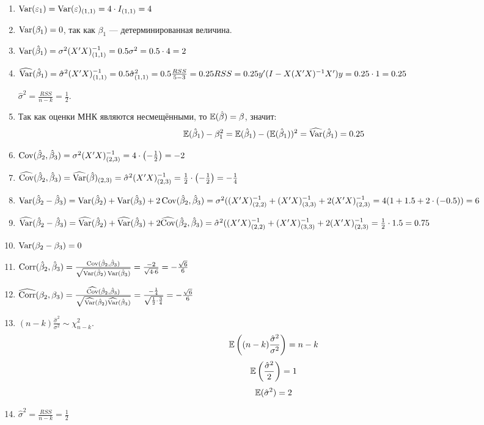 \begin{problem}
\begin{sol}
\begin{enumerate}
\item $\operatorname{Var}(\varepsilon_1)=\operatorname{Var}(\varepsilon)_{(1,1)}=4\cdot I_{(1,1)}=4$
\item $\operatorname{Var}(\beta_1)=0$, так как $\beta_1$ — детерминированная величина.
\item $\operatorname{Var}(\hat{\beta}_1)=\sigma^2(X'X)^{-1}_{(1,1)}=0.5\sigma^2=0.5\cdot 4=2$
\item $\widehat{\operatorname{Var}}(\hat{\beta}_1)=\hat\sigma^2(X'X)^{-1}_{(1,1)}=0.5\hat\sigma^2_{(1,1)}=0.5\frac{RSS}{5-3}=0.25RSS=0.25y'(I-X(X'X)^{-1}X')y=0.25\cdot 1=0.25$

$\hat\sigma^2=\frac{RSS}{n-k}=\frac12$.

\item Так как оценки МНК являются несмещёнными, то $\mathbb{E}(\hat{\beta})=\beta$, значит:
\[
\mathbb{E}(\hat{\beta}_1)-\beta_1^2=\mathbb{E}(\hat{\beta}_1)-(\mathbb{E}(\hat{\beta}_1))^2=\widehat{\operatorname{Var}}(\hat{\beta}_1)=0.25
\]

\item $\operatorname{Cov}(\hat{\beta}_2,\hat{\beta}_3)=\sigma^2(X'X)^{-1}_{(2,3)}=4\cdot\left(-\frac12\right)=-2$
\item $\widehat{\operatorname{Cov}}(\hat{\beta}_2,\hat{\beta}_3)=\widehat{\operatorname{Var}}(\hat\beta)_{(2,3)}=\hat\sigma^2(X'X)^{-1}_{(2,3)}=\frac{1}{2}\cdot\left(-\frac12\right)=-\frac14$

\item $\operatorname{Var}(\hat{\beta}_2-\hat{\beta}_3)=\operatorname{Var}(\hat{\beta}_2)+\operatorname{Var}(\hat{\beta}_3)+2\operatorname{Cov}(\hat{\beta}_2,\hat{\beta}_3)=\sigma^2((X'X)^{-1}_{(2,2)}+(X'X)^{-1}_{(3,3)}+2(X'X)^{-1}_{(2,3)}=4(1+1.5+2\cdot(-0.5))=6$

\item $\widehat{\operatorname{Var}}(\hat{\beta}_2-\hat{\beta}_3)=\widehat{\operatorname{Var}}(\hat{\beta}_2)+\widehat{\operatorname{Var}}(\hat{\beta}_3)+2\widehat{\operatorname{Cov}}(\hat{\beta}_2,\hat{\beta}_3)=\hat\sigma^2((X'X)^{-1}_{(2,2)}+(X'X)^{-1}_{(3,3)}+2(X'X)^{-1}_{(2,3)}=\frac{1}{2}\cdot1.5=0.75$

\item $\operatorname{Var}(\beta_2-\beta_3)=0$

\item $\operatorname{Corr}(\hat{\beta}_2,\hat{\beta}_3)=\frac{\operatorname{Cov}(\hat{\beta}_2,\hat{\beta}_3)}{\sqrt{\operatorname{Var}(\hat{\beta}_2)\operatorname{Var}(\hat{\beta}_3)}}=\frac{-2}{\sqrt{4\cdot6}}=-\frac{\sqrt6}{6}$

\item $\widehat{\operatorname{Corr}}(\beta_2,\beta_3)=\frac{\widehat{\operatorname{Cov}}(\hat{\beta}_2,\hat{\beta}_3)}{\sqrt{\widehat{\operatorname{Var}}(\hat{\beta}_2)\widehat{\operatorname{Var}}(\hat{\beta}_3)}}=\frac{-\frac14}{\sqrt{\frac12\cdot\frac34}}=-\frac{\sqrt6}{6}$

\item $(n-k)\frac{\hat\sigma^2}{\sigma^2}\sim\chi^2_{n-k}$.
\[
\mathbb{E}\left((n-k)\frac{\hat\sigma^2}{\sigma^2}\right)=n-k
\]
\[
\mathbb{E}\left(\frac{\hat\sigma^2}{2}\right)=1
\]
\[
\mathbb{E}(\hat\sigma^2)=2
\]

\item $\hat\sigma^2=\frac{RSS}{n-k}=\frac12$

\end{enumerate}

\end{sol}
\end{problem}



